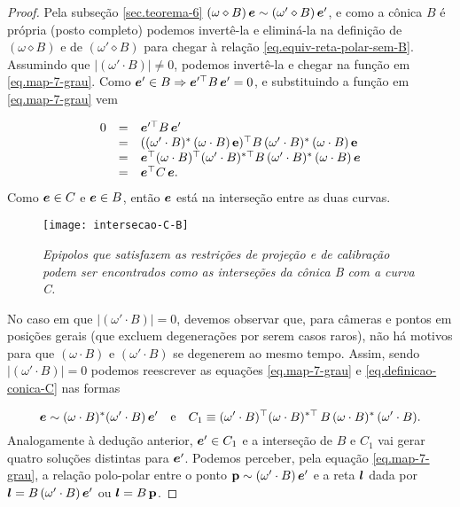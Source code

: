 \begin{proof}
Pela subseção \ref{sec.teorema-6} $(\omega\diamond B)\,\boldsymbol{e}\sim(\omega'\diamond B)\,\boldsymbol{e}'$, e como a cônica $B$ é própria (posto completo) podemos invertê-la e eliminá-la na definição de $(\omega\diamond B)$ e de $(\omega'\diamond B)$ para chegar à relação \ref{eq.equiv-reta-polar-sem-B}. Assumindo que $|(\omega'\cdot B)|\neq0$, podemos invertê-la e chegar na função em \ref{eq.map-7-grau}. Como $\boldsymbol{e}'\in B\Rightarrow \boldsymbol{e}'^\top B\,\boldsymbol{e}'=0$, e substituindo a função em \ref{eq.map-7-grau} vem

\begin{equation*}
\begin{array}{rcl}
0&=&\boldsymbol{e}'^\top B\,\boldsymbol{e}'\\
&=&((\omega' \cdot B)^*\,(\omega \cdot B)\,{\bf e})^\top B\,(\omega' \cdot B)^*\,(\omega \cdot B)\,{\bf e}\\
&=&\boldsymbol{e}^\top (\omega \cdot B)^\top (\omega' \cdot B)^{*\top}B\,(\omega' \cdot B)^*\,(\omega \cdot B)\,\boldsymbol{e}\\
&=&\boldsymbol{e}^\top C\,\boldsymbol{e}.
\end{array}
\end{equation*}  
Como $\boldsymbol{e} \in C$ e $\boldsymbol{e}\in B$, então $\boldsymbol{e}$ está na interseção entre as duas curvas.


\begin{figure}[!htb]
\centering
\texttt{[image: intersecao-C-B]}
\caption{\textit{Epipolos que satisfazem as restrições de projeção e de calibração podem ser encontrados como as interseções da cônica B com a curva C.}}
\label{inter-B-C}
\end{figure}

No caso em que $|(\omega'\cdot B)|=0$, devemos observar que, para câmeras e pontos em posições gerais (que excluem degenerações por serem casos raros), não há motivos para que $(\omega\cdot B)$ e $(\omega'\cdot B)$ se degenerem ao mesmo tempo. Assim, sendo $|(\omega'\cdot B)|=0$ podemos reescrever as equações \ref{eq.map-7-grau} e \ref{eq.definicao-conica-C} nas formas

\begin{equation*}
\boldsymbol{e}\sim (\omega\cdot B)^*(\omega'\cdot B)\,\boldsymbol{e}'\quad\text{e}\quad C_1 \equiv (\omega' \cdot B)^\top (\omega \cdot B)^{*\top}\,B\,(\omega \cdot B)^*\,(\omega' \cdot B).
\end{equation*}     
Analogamente à dedução anterior, $\boldsymbol{e}'\in C_1$ e a interseção de $B$ e $C_1$ vai gerar quatro soluções distintas para $\boldsymbol{e}'$. Podemos perceber, pela equação \ref{eq.map-7-grau}, a relação polo-polar entre o ponto ${\bf p}\sim (\omega'\cdot B)\,\boldsymbol{e}'$ e a reta $\boldsymbol{l}$ dada por $\boldsymbol{l}=B\,(\omega'\cdot B)\,\boldsymbol{e}'$ ou $\boldsymbol{l}=B\,{\bf p}$.
 

\end{proof}
